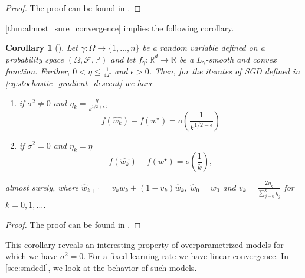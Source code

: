 \documentclass[12pt]{article}
\newtheorem{corollary}[theorem]{Corollary}
\theoremstyle{definition}
\newtheorem{assumption}[assumption]{Assumption}
\numberwithin{equation}{section}
\newcommand{\R}{\mathbb{R}}
\newcommand{\BP}{\mathbb{P}}
\newcommand{\CF}{\mathcal{F}}
\newcommand{\CL}{\mathcal{L}}
\begin{document}
\begin{proof}
  The proof can be found in \autocite{sebbouhAlmostSureConvergence2021}.
\end{proof}
\autoref{thm:almost_sure_convergence} implies the following corollary.
\begin{corollary}[]
  \label{cor:sgd_convergence}
  Let $\gamma : \Omega \rightarrow \{1,\dots,n\}$ be a random variable defined on a probability space $(\Omega, \CF, \BP)$ and let $f_{\gamma}: \R^d \rightarrow \R$ be a $L_\gamma$-smooth and convex function. Further, $0 < \eta \leq \frac{1}{4\CL}$ and $\epsilon > 0 $. Then, for the iterates of SGD defined in \eqref{eq:stochastic_gradient_descent} we have 
  \begin{enumerate}[label=(\roman*)]
    \item if $\sigma^2 \neq 0$ and $\eta_k = \frac{\eta}{k^{1/2+\epsilon}}$,
    \begin{equation*}
      f(\widehat{w_{k}}) - f(w^\star) = o\left(\frac{1}{k^{1/2-\epsilon}}\right)
    \end{equation*}
    \item if $\sigma^2 = 0$ and $\eta_k = \eta$
    \begin{equation*}
      f(\widehat{w_{k}}) - f(w^\star) = o\left(\frac{1}{k}\right),
    \end{equation*}
  \end{enumerate}
  almost surely, where $\widehat{w}_{k+1} = v_k w_k + (1-v_k)\widehat{w}_k, \; \widehat{w}_0 = w_0$ and $v_k = \frac{2\eta_k}{\sum_{j=0}^k\eta_j}$ for $k=0,1,\dots$.
\end{corollary}
\begin{proof}
  The proof can be found in \cite{sebbouhAlmostSureConvergence2021}.
\end{proof}
  This corollary reveals an interesting property of overparametrized models for which we have $\sigma^2 = 0$. For a fixed learning rate we have linear convergence. In \autoref{sec:smdedl}, we look at the behavior of such models.
\end{document}
